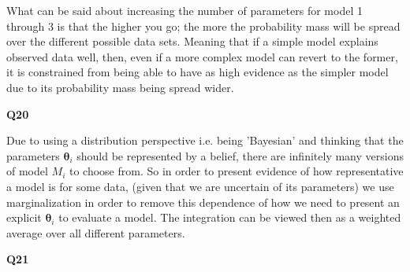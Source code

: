 \documentclass[a4paper]{article}
\begin{document}
What can be said about increasing the number of parameters for model 1 through 3 is that the higher you go; the more the probability mass will be spread over the different possible data sets. Meaning that if a simple model explains observed data well, then, even if a more complex model can revert to the former, it is constrained from being able to have as high evidence as the simpler model due to its probability mass being spread wider.

\hfil

\noindent\textbf{Q20}

\noindent\makebox[\linewidth]{\rule{\textwidth}{0.4pt}}
\hfil

\noindent Due to using a distribution perspective i.e. being 'Bayesian' and thinking that the parameters $\boldsymbol{\theta}_i$ should be represented by a belief, there are infinitely many versions of model $M_i$ to choose from. So in order to present evidence of how representative a model is for some data, (given that we are uncertain of its parameters) we use marginalization in order to remove this dependence of how we need to present an explicit $\boldsymbol{\theta}_i$ to evaluate a model. The integration can be viewed then as a weighted average over all different parameters.

\hfil

\noindent\textbf{Q21}

\noindent\makebox[\linewidth]{\rule{\textwidth}{0.4pt}}
\hfil

\noindent 
\end{document}
